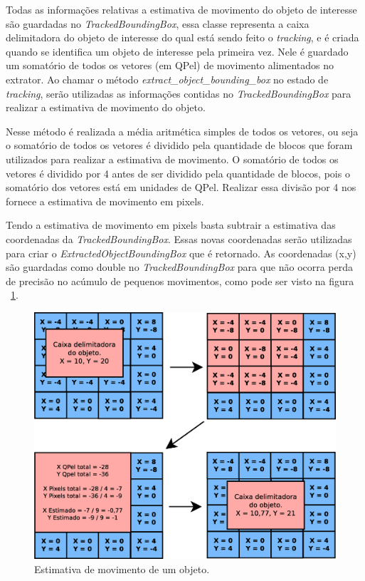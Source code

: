 Todas as informações relativas a estimativa de movimento do objeto de interesse são guardadas no \textit{TrackedBoundingBox}, essa classe representa a caixa delimitadora do objeto de interesse do qual está sendo feito o \textit{tracking}, e é criada quando se identifica um objeto de interesse pela primeira vez. Nele é guardado um somatório de todos os vetores (em QPel) de movimento alimentados no extrator. Ao chamar o método \textit{extract\_object\_bounding\_box} no estado de \textit{tracking}, serão utilizadas as informações contidas no \textit{TrackedBoundingBox} para realizar a estimativa de movimento do objeto.

Nesse método é realizada a média aritmética simples de todos os vetores, ou seja o somatório de todos os vetores é dividido pela quantidade de blocos que foram utilizados para realizar a estimativa de movimento. O somatório de todos os vetores é dividido por 4 antes de ser dividido pela quantidade de blocos, pois o somatório dos vetores está em unidades de QPel. Realizar essa divisão por 4 nos fornece a estimativa de movimento em pixels. 

Tendo a estimativa de movimento em pixels basta subtrair a estimativa das coordenadas da \textit{TrackedBoundingBox}. Essas novas coordenadas serão utilizadas para criar o \textit{ExtractedObjectBoundingBox} que é retornado. As coordenadas (x,y) são guardadas como double no \textit{TrackedBoundingBox} para que não ocorra perda de precisão no acúmulo de pequenos movimentos, como pode ser visto na figura ~\ref{fig:object_motion_estimation_example}. 


\begin{figure}[H]
\centering
\includegraphics[scale=0.45]{imagens/fig17.eps}
\caption{Estimativa de movimento de um objeto.}
\label{fig:object_motion_estimation_example}
\end{figure}


